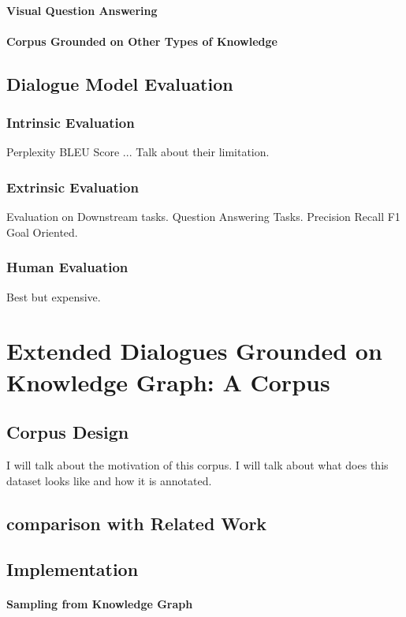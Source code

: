 \documentclass[bsc,frontabs,twoside,singlespacing,parskip,deptreport]{infthesis}     %
\begin{document}
\subsubsection*{Visual Question Answering}
\subsubsection*{Corpus Grounded on Other Types of Knowledge}

\section{Dialogue Model Evaluation}
\subsection{Intrinsic Evaluation}
Perplexity
BLEU Score
...
Talk about their limitation.
\subsection{Extrinsic Evaluation}
Evaluation on Downstream tasks.
Question Answering Tasks. Precision Recall F1
Goal Oriented.

\subsection{Human Evaluation}
Best but expensive.



\chapter{Extended Dialogues Grounded on Knowledge Graph: A Corpus}
\section{Corpus Design}
I will talk about the motivation of this corpus. I will talk about what does this dataset looks like and how it is annotated.

\section{comparison with Related Work}



\section{Implementation}
\subsubsection*{Sampling from Knowledge Graph}
\end{document}
